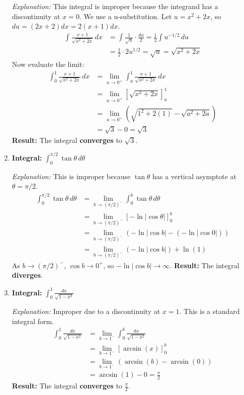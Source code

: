 \documentclass[12pt]{article}
\begin{document}
\begin{enumerate}[label=\alph*.]
    \textit{Explanation:} This integral is improper because the integrand has a discontinuity at $x=0$. We use a u-substitution. Let $u = x^2+2x$, so $du = (2x+2)dx = 2(x+1)dx$.
    \begin{align*}
        \int \frac{x+1}{\sqrt{x^2+2x}} \,dx &= \int \frac{1}{\sqrt{u}} \cdot \frac{du}{2} = \frac{1}{2} \int u^{-1/2} \,du \\
        &= \frac{1}{2} \cdot 2u^{1/2} = \sqrt{u} = \sqrt{x^2+2x}
    \end{align*}
    Now evaluate the limit:
    \begin{align*}
        \int_{0}^{1} \frac{x+1}{\sqrt{x^2 + 2x}} \,dx &= \lim_{a \to 0^+} \int_{a}^{1} \frac{x+1}{\sqrt{x^2 + 2x}} \,dx \\
        &= \lim_{a \to 0^+} \left[ \sqrt{x^2+2x} \right]_{a}^{1} \\
        &= \lim_{a \to 0^+} \left( \sqrt{1^2+2(1)} - \sqrt{a^2+2a} \right) \\
        &= \sqrt{3} - 0 = \sqrt{3}
    \end{align*}
    \textbf{Result:} The integral \textbf{converges} to $\sqrt{3}$.

    \item \textbf{Integral: } $\displaystyle \int_{0}^{\pi/2} \tan\theta \,d\theta$
    
    \textit{Explanation:} This is improper because $\tan\theta$ has a vertical asymptote at $\theta = \pi/2$.
    \begin{align*}
        \int_{0}^{\pi/2} \tan\theta \,d\theta &= \lim_{b \to (\pi/2)^-} \int_{0}^{b} \tan\theta \,d\theta \\
        &= \lim_{b \to (\pi/2)^-} \left[ -\ln|\cos\theta| \right]_{0}^{b} \\
        &= \lim_{b \to (\pi/2)^-} (-\ln|\cos b| - (-\ln|\cos 0|)) \\
        &= \lim_{b \to (\pi/2)^-} (-\ln|\cos b|) + \ln(1)
    \end{align*}
    As $b \to (\pi/2)^-$, $\cos b \to 0^+$, so $-\ln|\cos b| \to \infty$.
    \textbf{Result:} The integral \textbf{diverges}.

    \item \textbf{Integral: } $\displaystyle \int_{0}^{1} \frac{dx}{\sqrt{1-x^2}}$
    
    \textit{Explanation:} Improper due to a discontinuity at $x=1$. This is a standard integral form.
    \begin{align*}
        \int_{0}^{1} \frac{dx}{\sqrt{1-x^2}} &= \lim_{b \to 1^-} \int_{0}^{b} \frac{dx}{\sqrt{1-x^2}} \\
        &= \lim_{b \to 1^-} \left[ \arcsin(x) \right]_{0}^{b} \\
        &= \lim_{b \to 1^-} (\arcsin(b) - \arcsin(0)) \\
        &= \arcsin(1) - 0 = \frac{\pi}{2}
    \end{align*}
    \textbf{Result:} The integral \textbf{converges} to $\frac{\pi}{2}$.
    

\end{enumerate}
\end{document}
